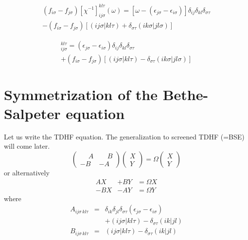 \documentclass[aps,prb,reprint,showpacs]{revtex4-1}
\begin{document}
\begin{multline}
( f_{i\sigma}  - f_{j\sigma} )  [\chi^{-1}]_{ij \sigma}^{kl \tau}(\omega) =
    [ \omega - ( \epsilon_{j\sigma} - \epsilon_{i\sigma} ) ] \delta_{ij} \delta_{kl} \delta_{\sigma\tau}  \\
    - ( f_{i\sigma}  - f_{j\sigma} ) [ ( ij \sigma | kl \tau ) + \delta_{\sigma\tau} ( ik \sigma | jl \sigma) ] 
\end{multline}


\begin{multline}
 [ H_\mathrm{BSE} ]_{ij \sigma}^{kl \tau} = 
      ( \epsilon_{j\sigma} - \epsilon_{i\sigma} ) \delta_{ij} \delta_{kl} \delta_{\sigma\tau}  \\
    + ( f_{i\sigma}  - f_{j\sigma} ) [ ( ij \sigma | kl \tau ) - \delta_{\sigma\tau} ( ik \sigma | jl \sigma) ] 
\end{multline}
 



\section{Symmetrization of the Bethe-Salpeter equation}


Let us write the TDHF equation.
The generalization to screened TDHF (=BSE) will come later.
\begin{equation}
 \left( 
   \begin{array}{cc}
      \phantom{-}A  &  \phantom{-}B \\
      -B  & -A 
   \end{array}
 \right) 
   \left(
   \begin{array}{c}
       X \\
       Y 
   \end{array}
   \right)
  = \Omega
   \left(
   \begin{array}{c}
       X \\
       Y 
   \end{array}
   \right)
\end{equation}
or alternatively
\begin{subequations}
\begin{eqnarray}
 \label{eq:xy1}
 A X   & + B Y    &=    \Omega X \\
 \label{eq:xy2}
 -B X  & -A Y     &= \Omega Y
\end{eqnarray}
\end{subequations}
where
\begin{subequations}
\begin{eqnarray}
 A_{ij\sigma \, kl \tau} & = & \delta_{ik} \delta_{jl} \delta_{\sigma\tau} (\epsilon_{j\sigma} - \epsilon_{i\sigma}) \nonumber \\
                         &   & + ( i j \sigma | k l \tau ) - \delta_{\sigma\tau} ( i k | j l ) \\
 B_{ij\sigma \, kl \tau} & = & ( i j \sigma | k l \tau )  - \delta_{\sigma\tau} ( i k | j l ) 
\end{eqnarray}
\end{subequations}
\end{document}
